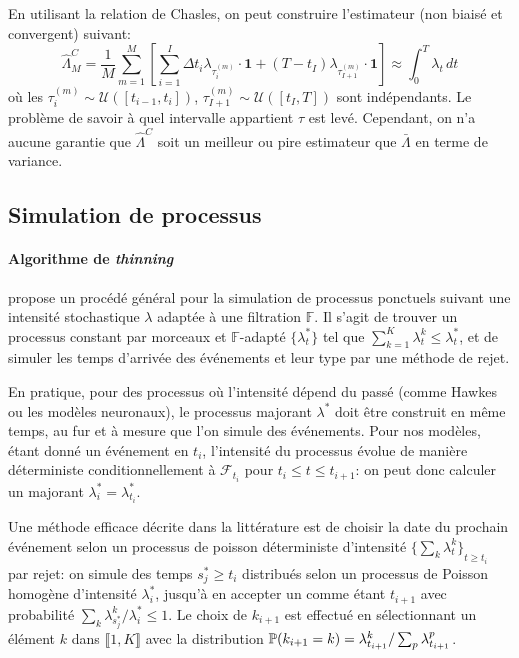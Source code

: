 \documentclass[../main.tex]{subfiles}
\begin{document}
En utilisant la relation de Chasles, on peut construire l'estimateur (non biaisé et convergent) suivant:
\begin{equation}
\hat{\Lambda}_M^C = \frac{1}{M}\sum_{m=1}^{M}\left[ \sum_{i=1}^{I} \Delta t_i\lambda_{\tau^{(m)}_i} \cdot \mathbf{1} + (T-t_{I})\lambda_{\tau^{(m)}_{I+1}}\cdot\mathbf{1}\right]
\approx
\int_0^T \lambda_t\,dt
\end{equation}
où les $\tau_i^{(m)}\sim\mathcal{U}([t_{i-1}, t_i])$, $\tau_{I+1}^{(m)}\sim\mathcal{U}([t_I, T])$ sont indépendants. Le problème de savoir à quel intervalle appartient $\tau$ est levé. Cependant, on n'a aucune garantie que $\hat{\Lambda}^C$ soit un meilleur ou pire estimateur que $\bar{\Lambda}$ en terme de variance.

\subsection{Simulation de processus}

\paragraph{Algorithme de \textit{thinning}} \citeauthor{ogata1981} propose un procédé général pour la simulation de processus ponctuels suivant une intensité stochastique $\lambda$ adaptée à une filtration $\mathds{F}$. Il s'agit de trouver un processus constant par morceaux et $\mathds{F}$-adapté $\{\lambda_t^*\}$ tel que $\sum_{k=1}^{K}\lambda^k_t \leq \lambda_t^*$, et de simuler les temps d'arrivée des événements et leur type par une méthode de rejet. \autocite{ogata1981}

En pratique, pour des processus où l'intensité dépend du passé (comme Hawkes ou les modèles neuronaux), le processus majorant $\lambda^*$ doit être construit en même temps, au fur et à mesure que l'on simule des événements. Pour nos modèles, étant donné un événement en $t_i$, l'intensité du processus évolue de manière déterministe conditionnellement à $\mathcal{F}_{t_i}$ pour $t_i\leq t\leq t_{i+1}$: on peut donc calculer un majorant $\lambda_i^* = \lambda^*_{t_i}$.

Une méthode efficace décrite dans la littérature est de choisir la date du prochain événement selon un processus de poisson déterministe d'intensité ${\{\sum_k\lambda^k_t\}}_{t\geq t_i}$ par rejet: on simule des temps $s_j^*\geq t_i$ distribués selon un processus de Poisson homogène d'intensité $\lambda_i^*$, jusqu'à en accepter un comme étant $t_{i+1}$ avec probabilité $\sum_k\lambda^k_{s_j^*}/\lambda^*_{i} \leq 1$. Le choix de $k_{i+1}$ est effectué en sélectionnant un élément $k$ dans $\llbracket 1,K\rrbracket$ avec la distribution $\mathbb{P}(k_{i+1} = k) = \lambda^{k}_{t_{i+1}}/\sum_p \lambda^p_{t_{i+1}}$. \cite{meiEisnerNeuralHawkes,ogata1981}
\end{document}
